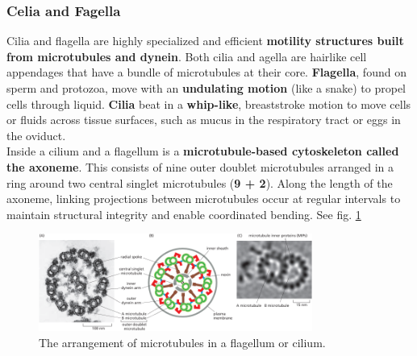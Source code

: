 \documentclass[../main.tex]{subfiles}
\begin{document}
\subsubsection{Celia and Fagella}
Cilia and flagella are highly specialized and efficient \textbf{motility structures built from microtubules and dynein}. Both cilia and agella are hairlike cell appendages that have a bundle of microtubules at their core. \textbf{Flagella}, found on sperm and protozoa, move with an \textbf{undulating motion} (like a snake) to propel cells through liquid. \textbf{Cilia} beat in a \textbf{whip-like}, breaststroke motion to move cells or fluids across tissue surfaces, such as mucus in the respiratory tract or eggs in the oviduct.\\
\indent Inside a cilium and a flagellum is a \textbf{microtubule-based cytoskeleton called the \gls{axoneme}}. This consists of nine outer doublet microtubules arranged in a ring around two central singlet microtubules (\textbf{9 + 2}). Along the length of the axoneme, linking projections between microtubules occur at regular intervals to maintain structural integrity and enable coordinated bending. See fig. \ref{flagandcili}
\begin{figure}[H]
	\centering
	\includegraphics[width = 0.8\textwidth]{36}
	\caption{The arrangement of microtubules in a flagellum or cilium.}
	\label{flagandcili}
\end{figure}
\end{document}
